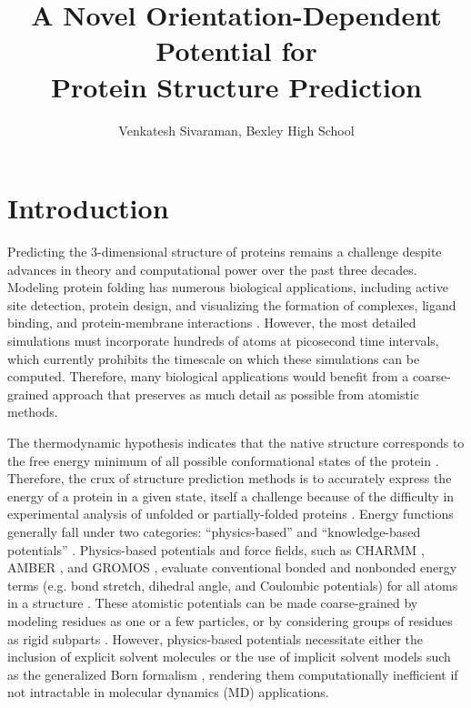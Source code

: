 \documentclass[11pt,twocolumn]{article}
\title{A Novel Orientation-Dependent Potential for \\Protein Structure Prediction}
\author{Venkatesh Sivaraman, Bexley High School}
\begin{document}
\maketitle

\raggedbottom

\begin{abstract}
\end{abstract}

\section{Introduction}
Predicting the 3-dimensional structure of proteins remains a challenge despite advances in theory and computational power over the past three decades.
Modeling protein folding has numerous biological applications, including active site detection, protein design, and visualizing the formation of complexes, ligand binding, and protein-membrane interactions \cite{baker2,kouza,monticelli}.
However, the most detailed simulations must incorporate hundreds of atoms at picosecond time intervals, which currently prohibits the timescale on which these simulations can be computed.
Therefore, many biological applications would benefit from a coarse-grained approach that preserves as much detail as possible from atomistic methods.

The thermodynamic hypothesis indicates that the native structure corresponds to the free energy minimum of all possible conformational states of the protein \cite{anfinsen}.
Therefore, the crux of structure prediction methods is to accurately express the energy of a protein in a given state, itself a challenge because of the difficulty in experimental analysis of unfolded or partially-folded proteins \cite{dill}. 
Energy functions generally fall under two categories: ``physics-based'' and ``knowledge-based potentials'' \cite{lu}.
Physics-based potentials and force fields, such as CHARMM \cite{brooks}, AMBER \cite{amber}, and GROMOS \cite{gromos}, evaluate conventional bonded and nonbonded energy terms (e.g. bond stretch, dihedral angle, and Coulombic potentials) for all atoms in a structure \cite{brooks2}.
These atomistic potentials can be made coarse-grained by modeling residues as one or a few particles, or by considering groups of residues as rigid subparts \cite{basdevant,potestio,enciso,monticelli}.
However, physics-based potentials necessitate either the inclusion of explicit solvent molecules \cite{onufriev} or the use of implicit solvent models such as the generalized Born formalism \cite{feig,roux}, rendering them computationally inefficient if not intractable in molecular dynamics (MD) applications.
\end{document}
